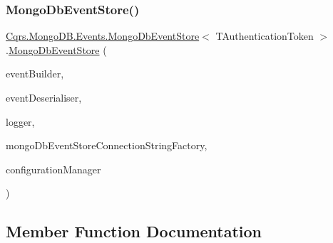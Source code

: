 \subsubsection{\texorpdfstring{Mongo\+Db\+Event\+Store()}{MongoDbEventStore()}}
{\footnotesize\ttfamily \hyperlink{classCqrs_1_1MongoDB_1_1Events_1_1MongoDbEventStore}{Cqrs.\+Mongo\+D\+B.\+Events.\+Mongo\+Db\+Event\+Store}$<$ T\+Authentication\+Token $>$.\hyperlink{classCqrs_1_1MongoDB_1_1Events_1_1MongoDbEventStore}{Mongo\+Db\+Event\+Store} (\begin{DoxyParamCaption}\item[{\hyperlink{interfaceCqrs_1_1Events_1_1IEventBuilder}{I\+Event\+Builder}$<$ T\+Authentication\+Token $>$}]{event\+Builder,  }\item[{\hyperlink{interfaceCqrs_1_1Events_1_1IEventDeserialiser}{I\+Event\+Deserialiser}$<$ T\+Authentication\+Token $>$}]{event\+Deserialiser,  }\item[{I\+Logger}]{logger,  }\item[{\hyperlink{interfaceCqrs_1_1MongoDB_1_1Events_1_1IMongoDbEventStoreConnectionStringFactory}{I\+Mongo\+Db\+Event\+Store\+Connection\+String\+Factory}}]{mongo\+Db\+Event\+Store\+Connection\+String\+Factory,  }\item[{\hyperlink{interfaceCqrs_1_1Configuration_1_1IConfigurationManager}{I\+Configuration\+Manager}}]{configuration\+Manager }\end{DoxyParamCaption})}



\subsection{Member Function Documentation}
\mbox{\label{classCqrs_1_1MongoDB_1_1Events_1_1MongoDbEventStore_a7a1ac8e59dc5bff0bb6562fb4f43e8df_a7a1ac8e59dc5bff0bb6562fb4f43e8df}} 
